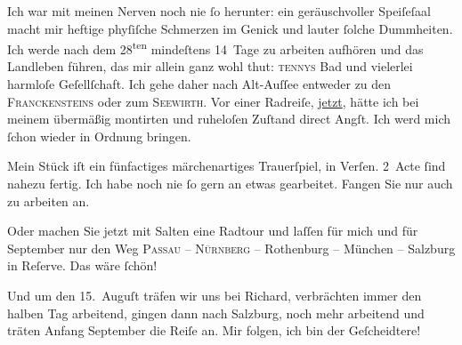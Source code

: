 \pstart
           Ich war mit meinen Nerven noch nie{ }ſo herunter: ein geräuschvoller Speiſeſaal macht
               mir heftige phyſiſche Schmerzen im Genick und lauter{ }ſolche Dummheiten. Ich werde
               nach dem 28\textsuperscript{ten} mindeſtens 14 Tage zu arbeiten aufhören {\pb}und das Landleben führen, das mir allein ganz wohl thut: \textsc{tennys} Bad und vielerlei harmloſe Geſellſchaft. Ich gehe daher nach Alt-Auſſee entweder zu den \textsc{Franckensteins} oder zum \textsc{Seewirth}. Vor einer Radreiſe, \uline{jetzt}, hätte ich bei
               meinem übermäßig montirten und ruheloſen Zuſtand direct Angſt. {\pb}Ich werd mich{ }ſchon wieder in
               Ordnung bringen.\pend
           
\pstart
           Mein Stück iſt ein fünfactiges
               märchenartiges Trauerſpiel, in Verſen. 2 Acte{ }ſind nahezu fertig. Ich habe noch nie{ }ſo gern an etwas gearbeitet. Fangen Sie nur auch zu arbeiten an.\pend
           
\pstart
           Oder machen Sie jetzt mit Salten eine Radtour
                  {\pb}und laſſen für mich und für
                  September nur den Weg \textsc{Passau} – \textsc{Nürnberg} – Rothenburg – München – Salzburg in
               Reſerve. Das wäre{ }ſchön!\pend
           
\pstart
           Und um den 15. Auguſt träfen wir uns bei Richard, verbrächten immer den halben Tag arbeitend, gingen
               dann {\pb}nach Salzburg, noch mehr arbeitend und träten Anfang September die Reiſe an. Mir folgen, ich bin der Geſcheidtere!\pend
           

